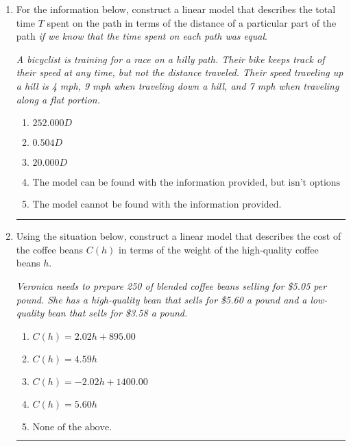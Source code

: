 \documentclass[14pt]{extbook}
\newcommand{\litem}[1]{\item#1\hspace*{-1cm}\rule{\textwidth}{0.4pt}}
\begin{document}
\begin{enumerate}
{\begin{enumerate}[label=\Alph*.]
\end{enumerate} }
\litem{
For the information below, construct a linear model that describes the total time $T$ spent on the path in terms of the distance of a particular part of the path \textit{if we know that the time spent on each path was equal}.
\begin{center}
    \textit{ A bicyclist is training for a race on a hilly path. Their bike keeps track of their speed at any time, but not the distance traveled. Their speed traveling up a hill is 4 mph, 9 mph when traveling down a hill, and 7 mph when traveling along a flat portion. }
\end{center}
\begin{enumerate}[label=\Alph*.]
\item \( 252.000 D \)
\item \( 0.504 D \)
\item \( 20.000 D \)
\item \( \text{The model can be found with the information provided, but isn't options 1-3.} \)
\item \( \text{The model cannot be found with the information provided.} \)

\end{enumerate} }
\litem{
Using the situation below, construct a linear model that describes the cost of the coffee beans $C(h)$ in terms of the weight of the high-quality coffee beans $h$.
\begin{center}
    \textit{ Veronica needs to prepare 250 of blended coffee beans selling for \$5.05 per pound. She has a high-quality bean that sells for \$5.60 a pound and a low-quality bean that sells for \$3.58 a pound. }
\end{center}
\begin{enumerate}[label=\Alph*.]
\item \( C(h) = 2.02 h + 895.00 \)
\item \( C(h) = 4.59 h \)
\item \( C(h) = -2.02 h + 1400.00 \)
\item \( C(h) = 5.60 h \)
\item \( \text{None of the above.} \)


\end{enumerate}}
\end{enumerate}
\end{document}
